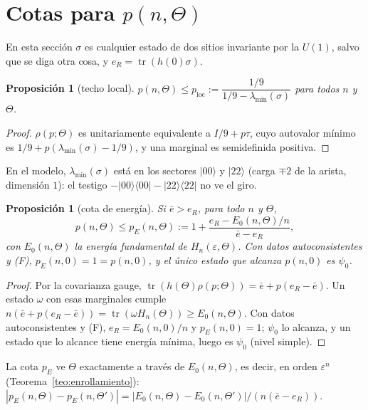 \documentclass[11pt,a4paper]{article}
\newtheorem{proposicion}[teorema]{Proposición}
\theoremstyle{definition}
\theoremstyle{remark}
\newcommand{\tr}{\operatorname{tr}}
\newcommand{\ket}[1]{|#1\rangle}
\newcommand{\bra}[1]{\langle #1|}
\newcommand{\eps}{\varepsilon}
\newcommand{\pE}{p_{E}}
\newcommand{\ploc}{p_{\mathrm{loc}}}
\begin{document}
\section{Cotas para $p(n,\Theta)$}\label{sec:cotas}

En esta sección $\sigma$ es cualquier estado de dos sitios invariante por la $U(1)$, salvo que se diga
otra cosa, y $e_R=\tr(h(0)\sigma)$.

\begin{proposicion}[techo local]\label{prop:local}
$p(n,\Theta)\le\ploc:=\dfrac{1/9}{1/9-\lambda_{\min}(\sigma)}$ para todos $n$ y $\Theta$.
\end{proposicion}

\begin{proof}
$\rho(p;\Theta)$ es unitariamente equivalente a $I/9+p\tau$, cuyo autovalor mínimo es
$1/9+p(\lambda_{\min}(\sigma)-1/9)$, y una marginal es semidefinida positiva.
\end{proof}

En el modelo, $\lambda_{\min}(\sigma)$ está en los sectores $\ket{00}$ y $\ket{22}$ (carga $\mp2$ de la
arista, dimensión $1$): el testigo $-\ket{00}\bra{00}-\ket{22}\bra{22}$ no ve el giro.

\begin{proposicion}[cota de energía]\label{prop:energia}
Si $\bar e>e_R$, para todo $n$ y $\Theta$,
\[
  p(n,\Theta)\le\pE(n,\Theta):=1+\frac{e_R-E_0(n,\Theta)/n}{\bar e-e_R},
\]
con $E_0(n,\Theta)$ la energía fundamental de $H_n(\eps,\Theta)$. Con datos autoconsistentes y (F),
$\pE(n,0)=1=p(n,0)$, y el único estado que alcanza $p(n,0)$ es $\psi_0$.
\end{proposicion}

\begin{proof}
Por la covarianza gauge, $\tr(h(\Theta)\rho(p;\Theta))=\bar e+p(e_R-\bar e)$. Un estado $\omega$ con
esas marginales cumple $n(\bar e+p(e_R-\bar e))=\tr(\omega H_n(\Theta))\ge E_0(n,\Theta)$. Con datos
autoconsistentes y (F), $e_R=E_0(n,0)/n$ y $\pE(n,0)=1$; $\psi_0$ lo alcanza, y un estado que lo
alcance tiene energía mínima, luego es $\psi_0$ (nivel simple).
\end{proof}

La cota $\pE$ ve $\Theta$ exactamente a través de $E_0(n,\Theta)$, es decir, en orden $\eps^n$
(Teorema~\ref{teo:enrollamiento}):
$|\pE(n,\Theta)-\pE(n,\Theta')|=|E_0(n,\Theta)-E_0(n,\Theta')|/(n(\bar e-e_R))$.
\end{document}
